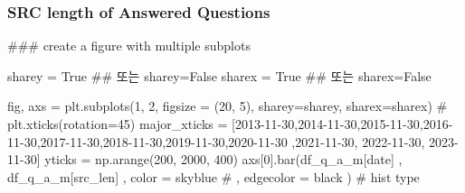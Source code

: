 \documentclass[
  letterpaper,
  DIV=11,
  numbers=noendperiod]{scrartcl}
\newenvironment{Shaded}{\begin{snugshade}}{\end{snugshade}}
\newcommand{\CommentTok}[1]{\textcolor[rgb]{0.37,0.37,0.37}{#1}}
\newcommand{\DecValTok}[1]{\textcolor[rgb]{0.68,0.00,0.00}{#1}}
\newcommand{\NormalTok}[1]{\textcolor[rgb]{0.00,0.23,0.31}{#1}}
\newcommand{\OperatorTok}[1]{\textcolor[rgb]{0.37,0.37,0.37}{#1}}
\newcommand{\StringTok}[1]{\textcolor[rgb]{0.13,0.47,0.30}{#1}}
\newcommand{\VariableTok}[1]{\textcolor[rgb]{0.07,0.07,0.07}{#1}}
\begin{document}
\subsubsection{SRC length of Answered
Questions}\label{src-length-of-answered-questions}

\begin{Shaded}
\begin{Highlighting}[]
\CommentTok{\#\#\# create a figure with multiple subplots}


\NormalTok{sharey }\OperatorTok{=} \VariableTok{True} \CommentTok{\#\# 또는 sharey=False}
\NormalTok{sharex }\OperatorTok{=} \VariableTok{True} \CommentTok{\#\# 또는 sharex=False}

\NormalTok{fig, axs }\OperatorTok{=}\NormalTok{ plt.subplots(}\DecValTok{1}\NormalTok{, }\DecValTok{2}\NormalTok{, figsize }\OperatorTok{=}\NormalTok{ (}\DecValTok{20}\NormalTok{, }\DecValTok{5}\NormalTok{), sharey}\OperatorTok{=}\NormalTok{sharey, sharex}\OperatorTok{=}\NormalTok{sharex)}
\CommentTok{\# plt.xticks(rotation=45)}
\NormalTok{major\_xticks }\OperatorTok{=}\NormalTok{ [}\StringTok{\textquotesingle{}2013{-}11{-}30\textquotesingle{}}\NormalTok{,}\StringTok{\textquotesingle{}2014{-}11{-}30\textquotesingle{}}\NormalTok{,}\StringTok{\textquotesingle{}2015{-}11{-}30\textquotesingle{}}\NormalTok{,}\StringTok{\textquotesingle{}2016{-}11{-}30\textquotesingle{}}\NormalTok{,}\StringTok{\textquotesingle{}2017{-}11{-}30\textquotesingle{}}\NormalTok{,}\StringTok{\textquotesingle{}2018{-}11{-}30\textquotesingle{}}\NormalTok{,}\StringTok{\textquotesingle{}2019{-}11{-}30\textquotesingle{}}\NormalTok{,}\StringTok{\textquotesingle{}2020{-}11{-}30\textquotesingle{}}
\NormalTok{                ,}\StringTok{\textquotesingle{}2021{-}11{-}30\textquotesingle{}}\NormalTok{, }\StringTok{\textquotesingle{}2022{-}11{-}30\textquotesingle{}}\NormalTok{, }\StringTok{\textquotesingle{}2023{-}11{-}30\textquotesingle{}}\NormalTok{]}
\NormalTok{yticks }\OperatorTok{=}\NormalTok{ np.arange(}\DecValTok{200}\NormalTok{, }\DecValTok{2000}\NormalTok{, }\DecValTok{400}\NormalTok{)}
\NormalTok{axs[}\DecValTok{0}\NormalTok{].bar(df\_q\_a\_m[}\StringTok{\textquotesingle{}date\textquotesingle{}}\NormalTok{]}
\NormalTok{        ,  df\_q\_a\_m[}\StringTok{\textquotesingle{}src\_len\textquotesingle{}}\NormalTok{]}
\NormalTok{        ,  color }\OperatorTok{=} \StringTok{\textquotesingle{}skyblue\textquotesingle{}}
        \CommentTok{\# ,  edgecolor = \textquotesingle{}black\textquotesingle{}}
\NormalTok{      ) }\CommentTok{\# hist type}



\end{Highlighting}
\end{Shaded}
\end{document}
